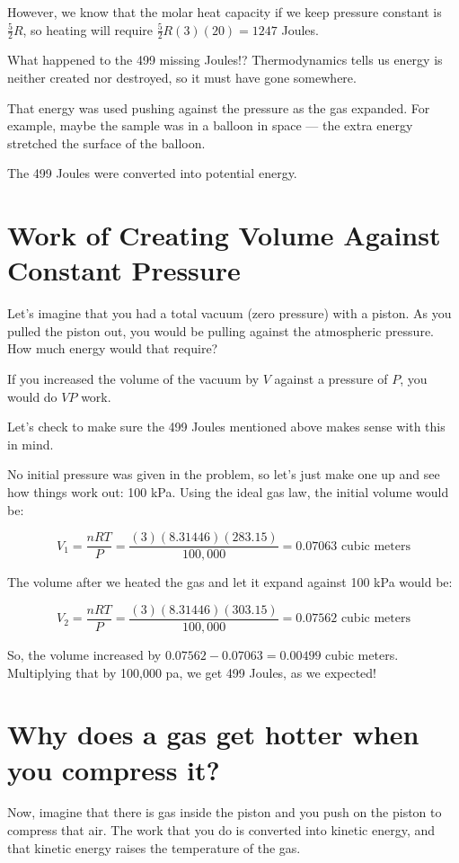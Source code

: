 However,  we know that the molar heat capacity if we keep pressure constant is $\frac{5}{2}R$,  so  heating will require $\frac{5}{2}R(3)(20) = 1247$ Joules.  

What happened to the 499 missing Joules!?  Thermodynamics tells us energy is neither created nor destroyed, so it must have gone somewhere.

That energy was used pushing against the pressure as the gas expanded.  For example,  maybe the sample was in a balloon in space --- the extra energy stretched the surface of the balloon.  

The 499 Joules were converted into potential energy.   

\section{Work of Creating Volume Against Constant Pressure}

Let's imagine that you had a total vacuum (zero pressure) with a piston.  As you pulled the piston out,  you would be pulling against  the atmospheric pressure.  How much energy would that require?

If you increased the volume of the vacuum by $V$ against a pressure of $P$, you would do $VP$ work.

Let's check to make sure the 499 Joules mentioned above makes sense with this in mind.

No initial pressure was given in the problem, so let's just make one up and see how things work out: 100 kPa.  Using the ideal gas law,  the initial volume would be:

$$V_1 = \frac{n R T}{P} = \frac{(3)(8.31446)(283.15)}{100,000} = 0.07063\text{ cubic meters}$$

The volume after we heated the gas and let it expand against 100 kPa would be:

$$V_2 = \frac{n R T}{P} = \frac{(3)(8.31446)(303.15)}{100,000} = 0.07562\text{ cubic meters}$$

So, the volume increased by $0.07562 - 0.07063 = 0.00499$ cubic meters.   
Multiplying that by 100,000 pa, we get 499 Joules, as we expected!

\section{Why does a gas get hotter when you compress it?}

Now, imagine that there is gas inside the piston and you push on the piston to compress that air.   The work that you do is converted into kinetic energy,  and that kinetic energy raises the temperature of the gas.

